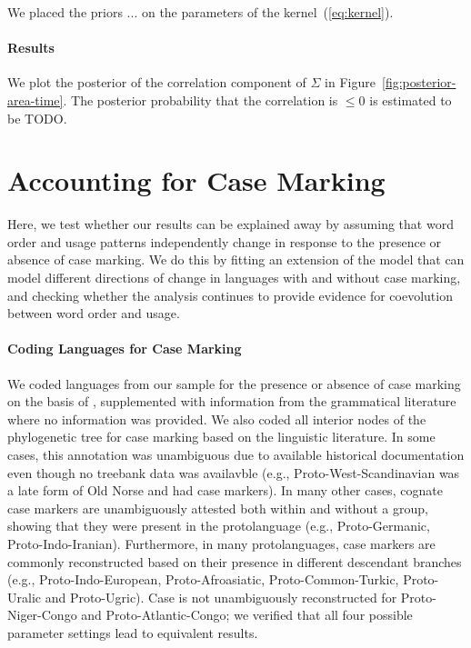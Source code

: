 \documentclass[11pt,a4paper]{article}
\begin{document}
We placed the priors ... on the parameters of the kernel~(\ref{eq:kernel}).

\paragraph{Results}
We plot the posterior of the correlation component of $\Sigma$ in Figure~\ref{fig:posterior-area-time}.
The posterior probability that the correlation is $\leq 0$ is estimated to be TODO.







\section{Accounting for Case Marking}

Here, we test whether our results can be explained away by assuming that word order and usage patterns independently change in response to the presence or absence of case marking.
We do this by fitting an extension of the model that can model different directions of change in languages with and without case marking, and checking whether the analysis continues to provide evidence for coevolution between word order and usage.

\paragraph{Coding Languages for Case Marking}
We coded languages from our sample for the presence or absence of case marking on the basis of \citep{iggesen2013number}, supplemented with information from the grammatical literature where no information was provided.
We also coded all interior nodes of the phylogenetic tree for case marking based on the linguistic literature.
In some cases, this annotation was unambiguous due to available historical documentation even though no treebank data was availavble (e.g., Proto-West-Scandinavian was a late form of Old Norse and had case markers).
In many other cases, cognate case markers are unambiguously attested both within and without a group, showing that they were present in the protolanguage (e.g., Proto-Germanic, Proto-Indo-Iranian).
Furthermore, in many protolanguages, case markers are commonly reconstructed based on their presence in different descendant branches (e.g., Proto-Indo-European, Proto-Afroasiatic, Proto-Common-Turkic, Proto-Uralic and Proto-Ugric). %
Case is not unambiguously reconstructed for Proto-Niger-Congo and Proto-Atlantic-Congo; we verified that all four possible parameter settings lead to equivalent results.
\end{document}
